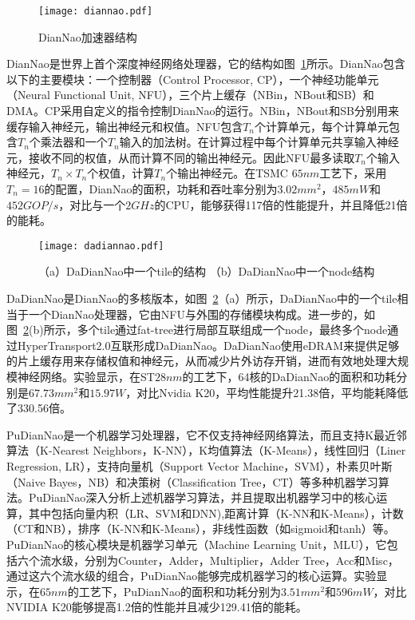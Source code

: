 \begin{figure}[h]
  \centering
  \texttt{[image: diannao.pdf]}
  \caption{\footnotesize DianNao加速器结构}
  \label{fig:diannao}
\end{figure}

DianNao是世界上首个深度神经网络处理器，它的结构如图~\ref{fig:diannao}所示。DianNao包含以下的主要模块：一个控制器（Control Processor, CP），一个神经功能单元（Neural Functional Unit, NFU），三个片上缓存（NBin，NBout和SB）和DMA。CP采用自定义的指令控制DianNao的运行。NBin，NBout和SB分别用来缓存输入神经元，输出神经元和权值。NFU包含$T_n$个计算单元，每个计算单元包含$T_n$个乘法器和一个$T_n$输入的加法树。在计算过程中每个计算单元共享输入神经元，接收不同的权值，从而计算不同的输出神经元。因此NFU最多读取$T_n$个输入神经元，$T_n\times T_n$个权值，计算$T_n$个输出神经元。在TSMC $65nm$工艺下，采用$T_n=16$的配置，DianNao的面积，功耗和吞吐率分别为$3.02mm^2$，$485mW$和$452GOP/s$，对比与一个$2GHz$的CPU，能够获得117倍的性能提升，并且降低21倍的能耗。

\begin{figure}[h]
  \centering
  \texttt{[image: dadiannao.pdf]}
  \caption{\footnotesize （a）DaDianNao中一个tile的结构 （b）DaDianNao中一个node结构}
  \label{fig:dadiannao}
\end{figure}

DaDianNao是DianNao的多核版本，如图~\ref{fig:dadiannao}（a）所示，DaDianNao中的一个tile相当于一个DianNao处理器，它由NFU与外围的存储模块构成。进一步的，如图~\ref{fig:dadiannao}(b)所示，多个tile通过fat-tree进行局部互联组成一个node，最终多个node通过HyperTransport2.0互联形成DaDianNao。DaDianNao使用eDRAM来提供足够的片上缓存用来存储权值和神经元，从而减少片外访存开销，进而有效地处理大规模神经网络。实验显示，在ST$28nm$的工艺下，64核的DaDianNao的面积和功耗分别是$67.73mm^2$和$15.97W$，对比Nvidia K20，平均性能提升21.38倍，平均能耗降低了330.56倍。

PuDianNao是一个机器学习处理器，它不仅支持神经网络算法，而且支持K最近邻算法（K-Nearest Neighbors，K-NN），K均值算法（K-Means），线性回归（Liner Regression, LR），支持向量机（Support Vector Machine，SVM），朴素贝叶斯（Naive Bayes，NB）和决策树（Classification Tree，CT）等多种机器学习算法。PuDianNao深入分析上述机器学习算法，并且提取出机器学习中的核心运算，其中包括向量内积（LR、SVM和DNN),距离计算（K-NN和K-Means），计数（CT和NB），排序（K-NN和K-Means），非线性函数（如sigmoid和tanh）等。PuDianNao的核心模块是机器学习单元（Machine Learning Unit，MLU），它包括六个流水级，分别为Counter，Adder，Multiplier，Adder Tree，Acc和Misc，通过这六个流水级的组合，PuDianNao能够完成机器学习的核心运算。实验显示，在$65nm$的工艺下，PuDianNao的面积和功耗分别为$3.51mm^2$和$596mW$，对比NVIDIA K20能够提高1.2倍的性能并且减少129.41倍的能耗。

